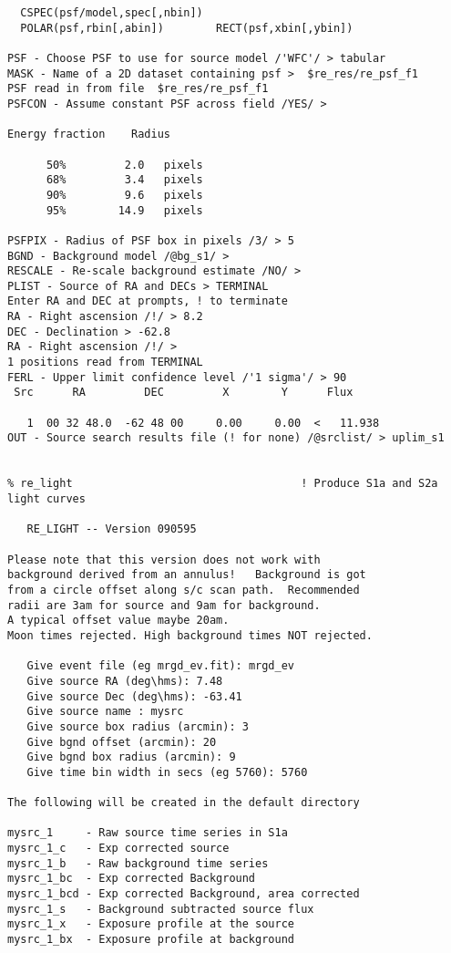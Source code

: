 \begin{small}
\begin{verbatim}
  CSPEC(psf/model,spec[,nbin])
  POLAR(psf,rbin[,abin])        RECT(psf,xbin[,ybin])

PSF - Choose PSF to use for source model /'WFC'/ > tabular
MASK - Name of a 2D dataset containing psf >  $re_res/re_psf_f1
PSF read in from file  $re_res/re_psf_f1
PSFCON - Assume constant PSF across field /YES/ >

Energy fraction    Radius

      50%         2.0   pixels
      68%         3.4   pixels
      90%         9.6   pixels
      95%        14.9   pixels

PSFPIX - Radius of PSF box in pixels /3/ > 5
BGND - Background model /@bg_s1/ >
RESCALE - Re-scale background estimate /NO/ >
PLIST - Source of RA and DECs > TERMINAL
Enter RA and DEC at prompts, ! to terminate
RA - Right ascension /!/ > 8.2
DEC - Declination > -62.8
RA - Right ascension /!/ >
1 positions read from TERMINAL
FERL - Upper limit confidence level /'1 sigma'/ > 90
 Src      RA         DEC         X        Y      Flux

   1  00 32 48.0  -62 48 00     0.00     0.00  <   11.938
OUT - Source search results file (! for none) /@srclist/ > uplim_s1


% re_light                                   ! Produce S1a and S2a light curves

   RE_LIGHT -- Version 090595

Please note that this version does not work with
background derived from an annulus!   Background is got
from a circle offset along s/c scan path.  Recommended
radii are 3am for source and 9am for background.
A typical offset value maybe 20am.
Moon times rejected. High background times NOT rejected.

   Give event file (eg mrgd_ev.fit): mrgd_ev
   Give source RA (deg\hms): 7.48
   Give source Dec (deg\hms): -63.41
   Give source name : mysrc
   Give source box radius (arcmin): 3
   Give bgnd offset (arcmin): 20
   Give bgnd box radius (arcmin): 9
   Give time bin width in secs (eg 5760): 5760

The following will be created in the default directory

mysrc_1     - Raw source time series in S1a
mysrc_1_c   - Exp corrected source
mysrc_1_b   - Raw background time series
mysrc_1_bc  - Exp corrected Background
mysrc_1_bcd - Exp corrected Background, area corrected
mysrc_1_s   - Background subtracted source flux
mysrc_1_x   - Exposure profile at the source
mysrc_1_bx  - Exposure profile at background


\end{verbatim}
\end{small}
